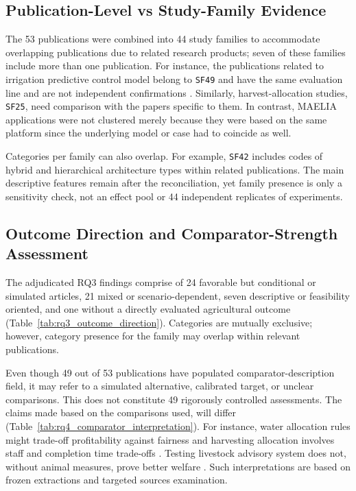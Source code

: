 \documentclass[11pt,a4paper]{article}
\begin{document}
\subsection{Publication-Level vs Study-Family Evidence}

The 53 publications were combined into 44 study families to accommodate overlapping publications due to related research products; seven of these families include more than one publication. For instance, the publications related to irrigation predictive control model belong to \texttt{SF49} and have the same evaluation line and are not independent confirmations
\parencite{cobbenhagen_optimal_2022,schoonen_optimal_2019}.
Similarly, harvest-allocation studies, \texttt{SF25}, need comparison with the papers specific to them. In contrast, MAELIA applications were not clustered merely because they were based on the same platform since the underlying model or case had to coincide as well.

Categories per family can also overlap. For example, \texttt{SF42} includes codes of hybrid and hierarchical architecture types within related publications. The main descriptive features remain after the reconciliation, yet family presence is only a sensitivity check, not an effect pool or 44 independent replicates of experiments.

\subsection{Outcome Direction and Comparator-Strength Assessment}

The adjudicated RQ3 findings comprise of 24 favorable but conditional or simulated articles, 21 mixed or scenario-dependent, seven descriptive or feasibility oriented, and one without a directly evaluated agricultural outcome (Table~\ref{tab:rq3_outcome_direction}). Categories are mutually exclusive; however, category presence for the family may overlap within relevant publications.

Even though 49 out of 53 publications have populated comparator-description field, it may refer to a simulated alternative, calibrated target, or unclear comparisons. This does not constitute 49 rigorously controlled assessments. The claims made based on the comparisons used, will differ (Table~\ref{tab:rq4_comparator_interpretation}). For instance, water allocation rules might trade-off profitability against fairness \parencite{mahmoudian_adaptive_2025} and harvesting allocation involves staff and completion time trade-offs \parencite{harman_challenges_2023}. Testing livestock advisory system does not, without animal measures, prove better welfare \parencite{t_shanteer_cownet-ai_2026}. Such interpretations are based on frozen extractions and targeted sources examination.
\end{document}
